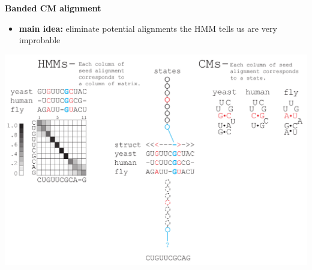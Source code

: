 \documentclass[landscape]{slides}
\begin{document}
\begin{slide}
\begin{center}
\large
\textbf{Banded CM alignment}
\end{center}
\medskip
\small
\begin{itemize}
\item
\textbf{main idea:} eliminate potential alignments the HMM tells us are very improbable
\end{itemize}
\begin{center}
\includegraphics[width=8in]{figs/post_hmm_to_cm_map2_layer11}
\end{center}
\vfill
\end{slide}
\end{document}
